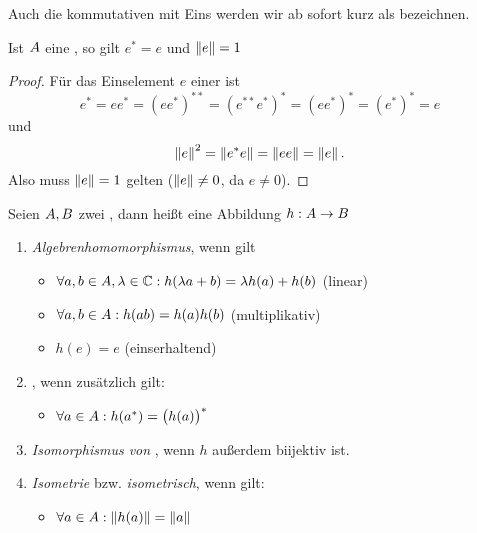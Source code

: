 \begin{bem}
Auch die kommutativen \CAlgn{} mit Eins werden wir ab sofort kurz als \emph{\CAlgn} bezeichnen.
\end{bem}

\begin{kor}\label{lemma:CAlg-Eigenschaften}
Ist $A$ eine \CAlg{}, so gilt $e^* = e$ und $\left\lVert e\right\rVert = 1$
\end{kor}

\begin{proof}%
Für das Einselement $e$ einer \CAlg{} ist
	\[e^* = ee^* = (ee^*)^{**} = (e^{**}e^*)^* = (ee^*)^* = (e^*)^* = e\]
und
	\[\left\lVert e\right\rVert^2 = \left\lVert e^*e\right\rVert = \left\lVert ee\right\rVert = \left\lVert e\right\rVert.\]
Also muss $\left\lVert e\right\rVert = 1$ gelten ($\left\lVert e\right\rVert \neq 0$, da $e \neq 0$).
\end{proof}


\begin{defn}\label{defn:AlgHom}\label{defn:CAlgHom}\label{defn:CAlgIso}\label{defn:Isometrie}
Seien $A, B$ zwei \CAlgn, dann heißt eine Abbildung $h: A \to B$ 
\begin{enumerate}
\item\emph{Algebrenhomomorphismus}, wenn gilt
\begin{itemize}
	\item $\forall a,b \in A, \lambda \in \mathbb{C}: h(\lambda a + b) = \lambda h(a) + h(b)$ (linear)
	\item $\forall a,b \in A: h(ab) = h(a)h(b)$ (multiplikativ)
	\item $h(e) = e$ (einserhaltend)
\end{itemize}

\item\emph{{\CAlgHom}}, wenn zusätzlich gilt:
\begin{itemize}
	\item $\forall a \in A: h(a^*) = \big(h(a)\big)^*$
\end{itemize}

\item\emph{Isomorphismus von \CAlgn}, wenn $h$ außerdem biijektiv ist.

\item\emph{Isometrie} bzw. \emph{isometrisch}, wenn gilt:
\begin{itemize}
	\item $\forall a \in A: \left\lVert h(a)\right\rVert = \left\lVert a\right\rVert$
\end{itemize}

\end{enumerate}
\end{defn}

